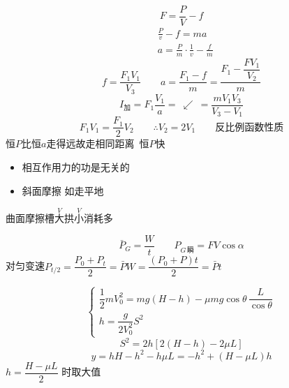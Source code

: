 \[
F=\frac{P}{V}-f
\]
\begin{align*}
&\frac{P}{v}-f=ma\\
&a=\frac{P}{m}\cdot\frac1v-\frac{f}{m}
\end{align*}
\[
f=\frac{F_1V_1}{V_3}\qquad a=\frac{F_1-f}{m}=\frac{F_1-\dfrac{FV_1}{V_2}}{m}
\]
\[
I_{\text{加}}=F_1\frac{V_1}{a}=\ \swarrow\ =\frac{mV_1V_3}{V_3-V_1}
\]
\[
F_1V_1=\frac{F_1}{2}V_2\qquad\therefore V_2=2V_1\qquad\text{反比例函数性质}
\]
恒$P$比恒$a$走得远\qquad 故走相同距离\ 恒$P$快
\begin{itemize}
\item 相互作用力的功是无关的
\item 斜面摩擦 如走平地
\end{itemize}
\begin{keybox}
曲面摩擦\quad 槽$\overset{V}{\text{大}}$拱$\overset{V}{\text{小}}$消耗多
\end{keybox}
\[ \bar P_G=\frac Wt\qquad P_{G\,\text{瞬}}=FV\cos\alpha \]
\noindent 对匀变速\quad $P_{t/2}=\dfrac{P_0+P_t}{2}=\bar P$\qquad $W=\dfrac{(P_0+P)t}{2}=\bar Pt$
\begin{problem}
\begin{solution}
\[ \begin{cases} \dfrac12mV_0^2=mg(H-h)-\mu mg\cos\theta\,\dfrac{L}{\cos\theta}\\[6pt] h=\dfrac{g}{2V_0^2}S^2\end{cases} \]
\[ S^2=2h\left[2(H-h)-2\mu L\right] \]
\[ y=hH-h^2-h\mu L=-h^2+(H-\mu L)h \]
\noindent $h=\dfrac{H-\mu L}{2}$ 时取大值
\end{solution}
\end{problem}

